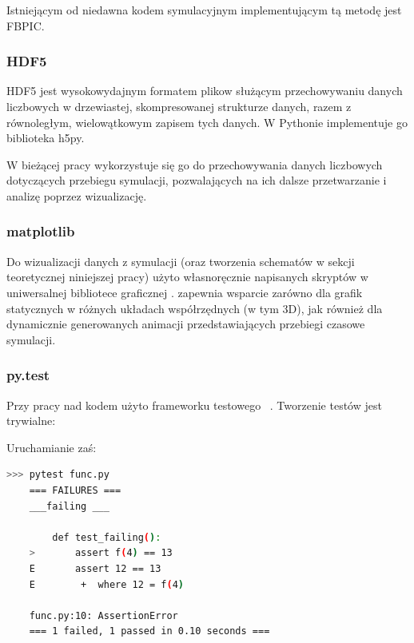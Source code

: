 

Istniejącym od niedawna kodem symulacyjnym implementującym tą metodę jest FBPIC\cite{fbpic}.


\subsubsection{HDF5}
HDF5 jest wysokowydajnym formatem plikow służącym przechowywaniu danych
liczbowych w drzewiastej, skompresowanej strukturze danych, razem z
równoległym, wielowątkowym zapisem tych danych.  W Pythonie implementuje go
biblioteka h5py\cite{h5py}.

W bieżącej pracy wykorzystuje się go do przechowywania danych liczbowych
dotyczących przebiegu symulacji, pozwalających na ich dalsze przetwarzanie
i analizę poprzez wizualizację.

\subsubsection{matplotlib}
Do wizualizacji danych z symulacji (oraz tworzenia schematów w sekcji
teoretycznej niniejszej pracy) użyto własnoręcznie napisanych skryptów w
uniwersalnej bibliotece graficznej \cite{matplotlib}.
 zapewnia wsparcie zarówno dla grafik statycznych w różnych układach
współrzędnych (w tym 3D), jak również dla dynamicznie generowanych animacji
przedstawiających przebiegi czasowe symulacji.

\subsubsection{py.test}
Przy pracy nad kodem użyto frameworku testowego ~\cite{pytest}.
Tworzenie testów jest trywialne:



Uruchamianie zaś:

\begin{lstlisting}[language=Bash]
    >>> pytest func.py
    === FAILURES ===
    ___failing ___

        def test_failing():
    >       assert f(4) == 13
    E       assert 12 == 13
    E        +  where 12 = f(4)

    func.py:10: AssertionError
    === 1 failed, 1 passed in 0.10 seconds ===
\end{lstlisting}

